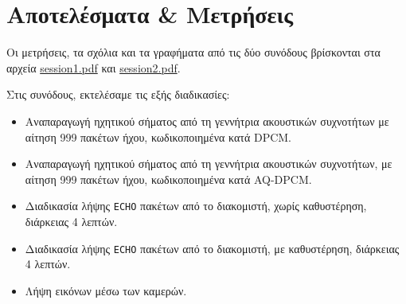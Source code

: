 \newcommand{\plothere}[2]{%
\\\noindent
\begin{minipage}{\linewidth}%
\centering%
\texttt{[image: images/\#1]}%
\captionof{figure}{#2}
\label{fig:#1}%
\end{minipage}%
}
\newcommand{\itemminipage}[1]{\begin{minipage}{\linewidth}
\item #1
\end{minipage}}
\chapter{Αποτελέσματα \& Μετρήσεις}
Οι μετρήσεις, τα σχόλια και τα γραφήματα από τις δύο συνόδους βρίσκονται στα αρχεία \url{session1.pdf} και \url{session2.pdf}.

Στις συνόδους, εκτελέσαμε τις εξής διαδικασίες:
\begin{itemize}
\item Αναπαραγωγή ηχητικού σήματος από τη γεννήτρια ακουστικών συχνοτήτων
με αίτηση 999 πακέτων ήχου, κωδικοποιημένα κατά DPCM.
\item Αναπαραγωγή ηχητικού σήματος από τη γεννήτρια ακουστικών συχνοτήτων,
με αίτηση 999 πακέτων ήχου, κωδικοποιημένα κατά AQ-DPCM.
\item Διαδικασία λήψης \texttt{ECHO} πακέτων από το διακομιστή, χωρίς καθυστέρηση, διάρκειας 4 λεπτών.
\item Διαδικασία λήψης \texttt{ECHO} πακέτων από το διακομιστή, με καθυστέρηση, διάρκειας 4 λεπτών.
\item Λήψη εικόνων μέσω των καμερών.
\end{itemize}

